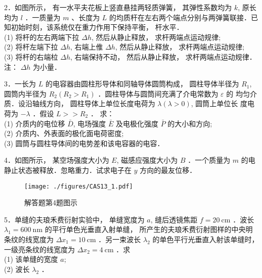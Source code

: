 2．如图所示， 有一水平夫花板上竖直悬挂两轻质弹簧， 其弹性系数均为 $k$, 原长均为 $l$ ．一质量为 $m$ 、长度为 $L$ 的均质杆在左右两个端点分别与两弹簧联接．已知初始时刻，该系统仅在重力作用下保持平衡， 杆水平．\\
(1) 将杆的左右两端下拉 $\Delta h$, 然后从静止释放， 求杆两端点运动规律;\\
(2) 将杆左端下拉 $\Delta h$, 右端上倠 $\Delta h$, 然后从静止释放， 求杆两端点运动规律;\\
(3) 将杆的右端柆 $\Delta h$, 右端保持不动， 然后从静止释放， 求杆两端点运动规律． 注： $\Delta h$ 为小量．

3．一长为 $L$ 的电容器由圆柱形导体和同轴导体圆筒构成， 圆柱导体半径为 $R_{1}$, 圆筒内半径为 $R_{2}\left(R_{2}>R_{1}\right)$ ．圆柱导体与圆筒间充满了介电常数为 $\varepsilon$ 的
均匀介质．设沿轴线方向， 圆柱导体上单位长度电荷为 $\lambda(\lambda>0)$, 圆筒上单位长 度电荷为 $-\lambda$ ．假设 $L>>R_{2}$ ． 求：\\
(1) 介质内的电位移 $\bar{D}$, 电场强度 $\bar{E}$ 及电极化强度 $\bar{P}$ 的大小和方向;\\
(2) 介质内、外表面的极化面电荷密度;\\
(3) 圆筒与圆柱导体间的电势差和该电容器的电容．

4．如图所示， 某空场强度大小为 $E$, 磁感应强度大小为 $B$ ．一个质量为 $m$ 的电静止状态被释放．忽略重力．试求电子在 $y$ 方向的最友位移．
\begin{figure}[ht]
\centering
\texttt{[image: ./figures/CAS13\_1.pdf]}
\caption{解答题第4题图示} \label{CAS13_fig1}
\end{figure}
5．单缝的夫琅禾费衍射实验中， 单缝宽度为 $a$, 缝后透镜焦距 $f=20 \mathrm{~cm}$ ．波长 $\lambda_1= 600 \mathrm{~nm}$ 的平行单色光垂直入射单缝， 所产生的夫琅禾费衍射图样的中央明条纹的线宽度为 $\Delta x_{1}=10 \mathrm{~cm}$ ．另一束波长 $\lambda_{2}$ 的单色平行光垂直入射该单缝时， 一级亮条纹的线宽度为 $\Delta x_{2}=4 \mathrm{~cm}$ ．求\\
(1) 该单缝的宽度 $a$;\\
(2) 波长 $\lambda_{2}$ ．
